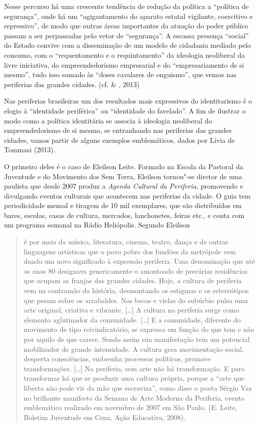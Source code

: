 Nesse percurso há uma crescente tendência de redução da política a
``política de segurança'', onde há um ``agigantamento do aparato estatal
vigilante, coercitivo e repressivo'', de modo que outras áreas
importantes da atuação do poder público passam a ser perpassadas pelo
vetor de ``segurança''. A escassa presença ``social'' do Estado convive
com a disseminação de um modelo de cidadania mediado pelo consumo, com o
``requentamento e o requintamento'' da ideologia neoliberal da livre
iniciativa, do empreendedorismo empresarial e do ``empresariamento de si
mesmo'', tudo isso somado às ``doses cavalares de onguismo'', que vemos
nas periferias das grandes cidades. (cf.  \& , 2013)

Nas periferias brasileiras um dos resultados mais expressivos do
identitarismo é o elogio à ``identidade periférica'' ou ``identidade do
favelado''. A fim de ilustrar o modo como a política identitária se
associa à ideologia neoliberal do empreendedorismo de si mesmo, se
entranhando nas periferias das grandes cidades, vamos partir de alguns
exemplos emblemáticos, dados por Lívia de Tommasi (2013).

O primeiro deles é o caso de Eleilson Leite. Formado na Escola da
Pastoral da Juventude e do Movimento dos Sem Terra, Eleilson tornou"-se
diretor de uma  paulista que desde 2007 produz a \emph{Agenda
Cultural da Periferia}, promovendo e divulgando eventos culturais que
acontecem nas periferias da cidade. O guia tem periodicidade mensal e
tiragem de 10 mil exemplares, que são distribuídos em bares, escolas,
casas de cultura, mercados, lanchonetes, feiras etc., e conta com um
programa semanal na Rádio Heliópolis. Segundo Eleilson

\begin{quote}
é por meio da música, literatura, cinema, teatro, dança e de outras
linguagens artísticas que o povo pobre dos fundões da metrópole vem
dando um novo significado à expressão periferia. Uma denominação que até
os anos 80 designava genericamente o amontoado de precárias residências
que ocupam as franjas das grandes cidades. Hoje, a cultura de periferia
vem na contramão da história, desmontando os estigmas e os estereótipos
que pesam sobre os arrabaldes. Nos becos e vielas do subúrbio pulsa uma
arte original, criativa e vibrante. {[}\ldots{}{]} A cultura na periferia
surge como elemento aglutinador da comunidade. {[}\ldots{}{]} E a comunidade,
diferente do movimento de tipo reivindicatório, se expressa em função do
que tem e não por aquilo de que carece. Sendo assim sua manifestação tem
um potencial mobilizador de grande intensidade. A cultura gera
movimentação social, desperta consciências, embrenha processos
políticos, promove transformações. {[}\ldots{}{]} Na periferia, sem arte não
há transformação. E para transformar há que se produzir uma cultura
própria, porque a ``arte que liberta não pode vir da mão que
escraviza'', como disse o poeta Sérgio Vaz no brilhante manifesto da
Semana de Arte Moderna da Periferia, evento emblemático realizado em
novembro de 2007 em São Paulo. (E. Leite, Boletim Juventude em Cena,
Ação Educativa, 2008).
\end{quote}

